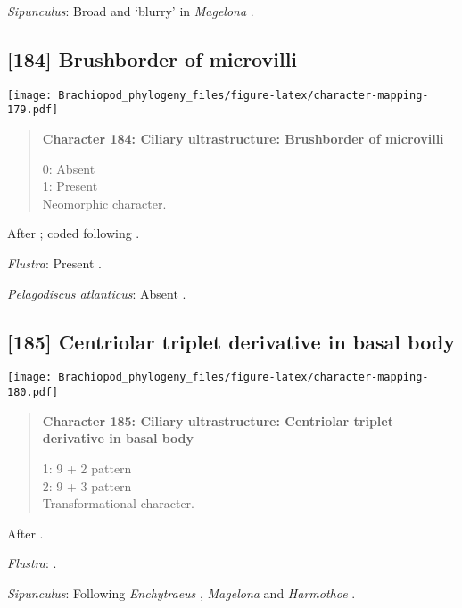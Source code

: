 \documentclass[openany]{book}
\theoremstyle{definition}
\theoremstyle{definition}
\theoremstyle{definition}
\theoremstyle{remark}
\begin{document}
\hypertarget{Sipunculus-coding-183}{}
\emph{Sipunculus}: Broad and `blurry' in \emph{Magelona}
\citep{Bartolomaeus1995}.

\subsection*{{[}184{]} Brushborder of
microvilli}\label{brushborder-of-microvilli}

\texttt{[image: Brachiopod\_phylogeny\_files/figure-latex/character-mapping-179.pdf]}

\begin{quote}
\textbf{Character 184: Ciliary ultrastructure: Brushborder of
microvilli}

0: Absent\\
1: Present\\
Neomorphic character.
\end{quote}

After \citet{Lundin2009}; coded following \citet{Smith2012}.

\hypertarget{Flustra-coding-184}{}
\emph{Flustra}: Present \citep{Reed1982}.

\hypertarget{Pelagodiscus_atlanticus-coding-184}{}
\emph{Pelagodiscus atlanticus}: Absent \citep{Luter1995}.

\subsection*{{[}185{]} Centriolar triplet derivative in basal
body}\label{centriolar-triplet-derivative-in-basal-body}

\texttt{[image: Brachiopod\_phylogeny\_files/figure-latex/character-mapping-180.pdf]}

\begin{quote}
\textbf{Character 185: Ciliary ultrastructure: Centriolar triplet
derivative in basal body}

1: 9 + 2 pattern\\
2: 9 + 3 pattern\\
Transformational character.
\end{quote}

After \citet{Lundin2009}.

\hypertarget{Flustra-coding-185}{}
\emph{Flustra}: \citet{Reed1982}.

\hypertarget{Sipunculus-coding-185}{}
\emph{Sipunculus}: Following \emph{Enchytraeus} \citep{Reger1967},
\emph{Magelona} \citep{Bartolomaeus1995} and \emph{Harmothoe}
\citep{Holborow1969}.
\end{document}
